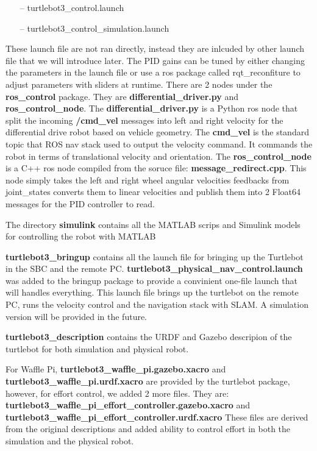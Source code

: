 \documentclass[12]{article}
\begin{document}
\begin{itemize}
	\item[--] turtlebot3\_control.launch
	\item[--] turtlebot3\_control\_simulation.launch
\end{itemize}  
These launch file are not ran directly, instead they are inlcuded by other launch file that we will introduce later.
The PID gains can be tuned by either changing the parameters in the launch file or use a ros package called rqt\_reconfiture to adjust parameters with sliders at runtime. 
There are 2 nodes under the \textbf{ros\_control} package. They are \textbf{differential\_driver.py} and \textbf{ros\_control\_node}. 
The \textbf{differential\_driver.py} is a Python ros node that split the incoming \textbf{\//cmd\_vel} messages into left and right velocity for the differential drive robot based on vehicle geometry. 
The \textbf{\/cmd\_vel} is the standard topic that ROS nav stack used to output the velocity command. It commands the robot in terms of translational velocity and orientation. 
The \textbf{ros\_control\_node} is a C++ ros node compiled from the soruce file: \textbf{message\_redirect.cpp}. 
This node simply takes the left and right wheel angular velocities feedbacks from \/joint\_states converts them to linear velocities and publish them into 2 Float64 messages for the PID controller to read.


The directory \textbf{simulink} contains all the MATLAB scrips and Simulink models for controlling the robot with MATLAB 

\textbf{turtlebot3\_bringup} contains all the launch file for bringing up the Turtlebot in the SBC and the remote PC. 
\textbf{turtlebot3\_physical\_nav\_control.launch} was added to the bringup package to provide a convinient one-file launch that will handles everything. 
This launch file brings up the turtlebot on the remote PC, runs the velocity control and the navigation stack with SLAM. A simulation version will be provided in the future.

\textbf{turtlebot3\_description} contains the URDF and Gazebo descripion of the turtlebot for both simulation and physical robot. 

For Waffle Pi, \textbf{turtlebot3\_waffle\_pi.gazebo.xacro}
and \textbf{turtlebot3\_waffle\_pi.urdf.xacro}
are provided by the turtlebot package, however, for effort control, we added 2 more files. 
They are: \textbf{turtlebot3\_waffle\_pi\_effort\_controller.gazebo.xacro}
and \textbf{turtlebot3\_waffle\_pi\_effort\_controller.urdf.xacro}
These files are derived from the original descriptions and added ability to control effort in both the simulation and the physical robot. 
\end{document}
